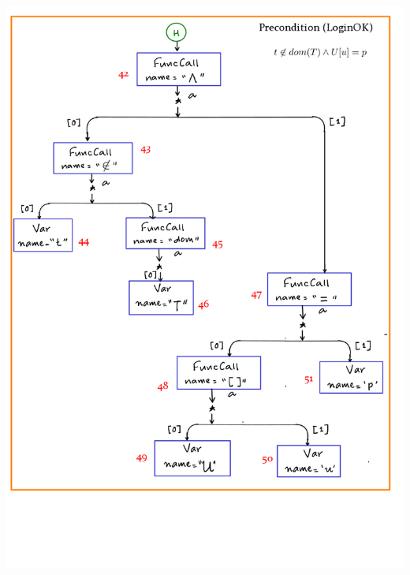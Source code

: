 \documentclass[12pts, a4paper]{article}
\begin{document}
\begin{center}
\includegraphics[width=\textwidth]{../images/spec-AST-7.png}


\end{center}
\end{document}
